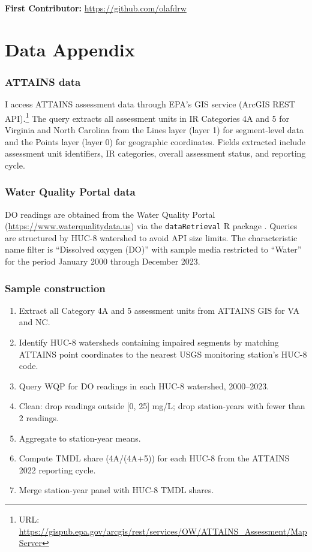 \documentclass[12pt]{article}
\begin{document}
\noindent\textbf{First Contributor:} \url{https://github.com/olafdrw}

\label{apep_main_text_end}
\newpage


\newpage
\appendix

\section{Data Appendix}
\label{app:data}

\subsubsection*{ATTAINS data} I access ATTAINS assessment data through EPA's GIS service (ArcGIS REST API).\footnote{URL: \url{https://gispub.epa.gov/arcgis/rest/services/OW/ATTAINS\_Assessment/MapServer}} The query extracts all assessment units in IR Categories 4A and 5 for Virginia and North Carolina from the Lines layer (layer 1) for segment-level data and the Points layer (layer 0) for geographic coordinates. Fields extracted include assessment unit identifiers, IR categories, overall assessment status, and reporting cycle.

\subsubsection*{Water Quality Portal data} DO readings are obtained from the Water Quality Portal (\url{https://www.waterqualitydata.us}) via the \texttt{dataRetrieval} R package \citep{dataretrieval}. Queries are structured by HUC-8 watershed to avoid API size limits. The characteristic name filter is ``Dissolved oxygen (DO)'' with sample media restricted to ``Water'' for the period January 2000 through December 2023.

\subsubsection*{Sample construction}

\begin{enumerate}
\item Extract all Category 4A and 5 assessment units from ATTAINS GIS for VA and NC.
\item Identify HUC-8 watersheds containing impaired segments by matching ATTAINS point coordinates to the nearest USGS monitoring station's HUC-8 code.
\item Query WQP for DO readings in each HUC-8 watershed, 2000--2023.
\item Clean: drop readings outside [0, 25] mg/L; drop station-years with fewer than 2 readings.
\item Aggregate to station-year means.
\item Compute TMDL share (4A/(4A+5)) for each HUC-8 from the ATTAINS 2022 reporting cycle.
\item Merge station-year panel with HUC-8 TMDL shares.
\end{enumerate}
\end{document}
